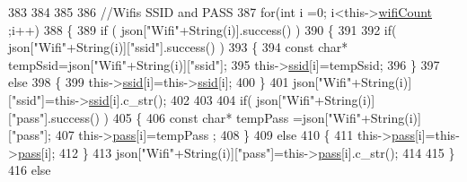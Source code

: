 \begin{DoxyCode}
383 
384             
385             
386             \textcolor{comment}{//Wifis SSID and PASS}
387             \textcolor{keywordflow}{for}(\textcolor{keywordtype}{int} i =0; i<this->\hyperlink{classCoolWifi_ab133bd92fcb895b884deecd6678592e4}{wifiCount} ;i++)
388             \{
389                 \textcolor{keywordflow}{if} ( json[\textcolor{stringliteral}{"Wifi"}+String(i)].success() )
390                 \{
391                     
392                     \textcolor{keywordflow}{if}( json[\textcolor{stringliteral}{"Wifi"}+String(i)][\textcolor{stringliteral}{"ssid"}].success() )
393                     \{
394                         \textcolor{keyword}{const} \textcolor{keywordtype}{char}* tempSsid=json[\textcolor{stringliteral}{"Wifi"}+String(i)][\textcolor{stringliteral}{"ssid"}]; 
395                         this->\hyperlink{classCoolWifi_a893b21d0fed821438733bba2e73fb4c2}{ssid}[i]=tempSsid;                 
396                     \}
397                     \textcolor{keywordflow}{else}
398                     \{
399                         this->\hyperlink{classCoolWifi_a893b21d0fed821438733bba2e73fb4c2}{ssid}[i]=this->\hyperlink{classCoolWifi_a893b21d0fed821438733bba2e73fb4c2}{ssid}[i];                    
400                     \}
401                     json[\textcolor{stringliteral}{"Wifi"}+String(i)][\textcolor{stringliteral}{"ssid"}]=this->\hyperlink{classCoolWifi_a893b21d0fed821438733bba2e73fb4c2}{ssid}[i].c\_str();
402                     
403                     
404                     \textcolor{keywordflow}{if}( json[\textcolor{stringliteral}{"Wifi"}+String(i)][\textcolor{stringliteral}{"pass"}].success() )
405                     \{
406                         \textcolor{keyword}{const} \textcolor{keywordtype}{char}* tempPass =json[\textcolor{stringliteral}{"Wifi"}+String(i)][\textcolor{stringliteral}{"pass"}];
407                         this->\hyperlink{classCoolWifi_a0c3332a149245aaad060b32593a54c9b}{pass}[i]=tempPass ;                    
408                     \}
409                     \textcolor{keywordflow}{else}
410                     \{
411                         this->\hyperlink{classCoolWifi_a0c3332a149245aaad060b32593a54c9b}{pass}[i]=this->\hyperlink{classCoolWifi_a0c3332a149245aaad060b32593a54c9b}{pass}[i];                    
412                     \}
413                     json[\textcolor{stringliteral}{"Wifi"}+String(i)][\textcolor{stringliteral}{"pass"}]=this->\hyperlink{classCoolWifi_a0c3332a149245aaad060b32593a54c9b}{pass}[i].c\_str();           
414                 
415                 \}
416                 \textcolor{keywordflow}{else}

\end{DoxyCode}
